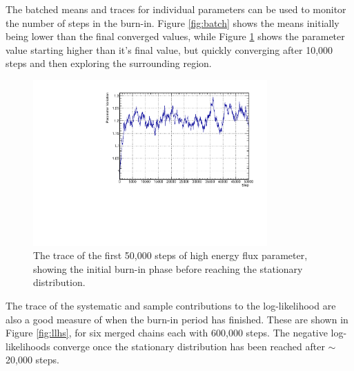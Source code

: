 The batched means and traces for individual parameters can be used to monitor the number of steps in the burn-in. Figure \ref{fig:batch} shows the means initially being lower than the final converged values, while Figure \ref{fig:burnin} shows the parameter value starting higher than it's final value, but quickly converging after 10,000 steps and then exploring the surrounding region. 

\begin{figure}[!htbp]
\centering
\includegraphics*[width=0.8\textwidth,clip]{figs/burnin}
\caption{The trace of the first 50,000 steps of high energy flux parameter, showing the initial burn-in phase before reaching the stationary distribution.}\label{fig:burnin}
\end{figure}

The trace of the systematic and sample contributions to the log-likelihood are also a good measure of when the burn-in period has finished. These are shown in Figure \ref{fig:llhs}, for six merged chains each with 600,000 steps. The negative log-likelihoods converge once the stationary distribution has been reached after $\sim$20,000 steps.

